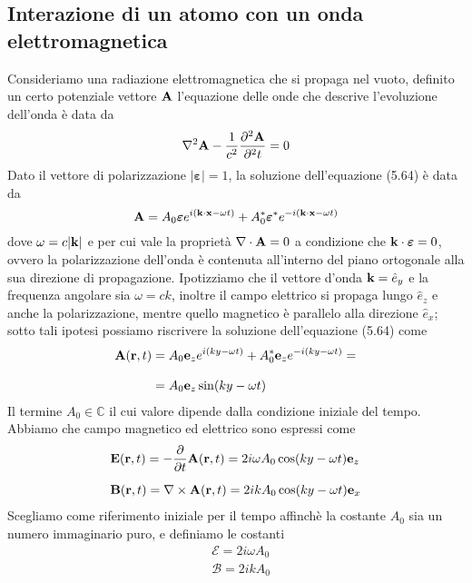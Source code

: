 \subsection{Interazione di un atomo con un onda elettromagnetica}
Consideriamo una radiazione elettromagnetica che si propaga nel vuoto, definito un certo potenziale vettore $\bold{A}$ l'equazione delle onde che descrive l'evoluzione dell'onda \`e data da
\begin{equation}
	\nabla^2\bold{A} - \frac{1}{c^2}\frac{\partial^2 \bold{A}}{\partial^2 t} = 0
\end{equation}
Dato il vettore di polarizzazione $|\boldsymbol{\varepsilon}|=1$, la soluzione dell'equazione (5.64) \`e data da
\begin{equation*}
	\bold{A} = A_0 \boldsymbol{\varepsilon}e^{i(\bold{k} \cdot \bold{x}-\omega t)} + A_0^*\boldsymbol{\varepsilon}^*e^{-i(\bold{k} \cdot \bold{x} - \omega t)}
\end{equation*}
dove $\omega = c  |\bold{k}|$ e per cui vale la propriet\`a $\nabla \cdot \bold{A} = 0$ a condizione che $\bold{k} \cdot \boldsymbol{\varepsilon} = 0$, ovvero la polarizzazione dell'onda \`e contenuta all'interno del piano ortogonale alla sua direzione di propagazione.	
Ipotizziamo che il vettore d'onda $\bold{k} = \hat{e}_{y}$ e la frequenza angolare sia $\omega = ck$, inoltre il campo elettrico si propaga lungo $\hat{e}_{z}$ e anche la polarizzazione, mentre quello magnetico \`e parallelo alla direzione $\hat{e}_{x}$; sotto tali ipotesi possiamo riscrivere la soluzione dell'equazione (5.64) come
\begin{align*}
	\bold{A}(\bold{r},t) & = A_0 \bold{e}_{z}e^{i(ky-\omega t)}+A_0^*\bold{e}_{z}e^{-i(ky-\omega t)} = \\[0.3cm]
	& = A_0 \bold{e}_{z}\sin(ky-\omega t)
\end{align*}
Il termine $A_0 \in \mathbb{C}$ il cui valore dipende dalla condizione iniziale del tempo. Abbiamo che  campo magnetico ed elettrico sono espressi come
\begin{align*}
	& \bold{E}(\bold{r},t) = - \frac{\partial }{\partial t}\bold{A}(\bold{r},t) = 2i\omega A_0 \cos(ky-\omega t)\bold{e}_{z} \\[0.2cm]
	& \bold{B}(\bold{r},t) = \nabla \times \bold{A}(\bold{r},t) = 2ikA_0 \cos(ky-\omega t) \bold{e}_x
\end{align*}
Scegliamo come riferimento iniziale per il tempo affinch\`e la costante $A_0$ sia un numero immaginario puro, e definiamo le costanti
\begin{align*}
	 & \mathcal{E} = 2i\omega A_0 \\[0.3cm] 
	 & \mathcal{B} = 2ikA_0
\end{align*}
